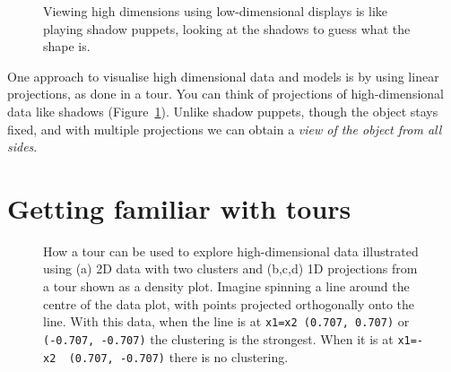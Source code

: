 \documentclass[
  letterpaper,
]{krantz}
\begin{document}
\begin{figure}


\caption{\label{fig-shadow-puppets}Viewing high dimensions using
low-dimensional displays is like playing shadow puppets, looking at the
shadows to guess what the shape is.}

\end{figure}%

One approach to visualise high dimensional data and models is by using
linear projections, as done in a tour. You can think of projections of
high-dimensional data like shadows (Figure~\ref{fig-shadow-puppets}).
Unlike shadow puppets, though the object stays fixed, and with multiple
projections we can obtain a \emph{view of the object from all sides}.

\section{Getting familiar with tours}\label{getting-familiar-with-tours}

\begin{figure}


\caption{\label{fig-explain-1D-pdf}How a tour can be used to explore
high-dimensional data illustrated using (a) 2D data with two clusters
and (b,c,d) 1D projections from a tour shown as a density plot. Imagine
spinning a line around the centre of the data plot, with points
projected orthogonally onto the line. With this data, when the line is
at \texttt{x1=x2\ (0.707,\ 0.707)} or \texttt{(-0.707,\ -0.707)} the
clustering is the strongest. When it is at
\texttt{x1=-x2\ \ (0.707,\ -0.707)} there is no clustering.
}

\end{figure}%
\end{document}
